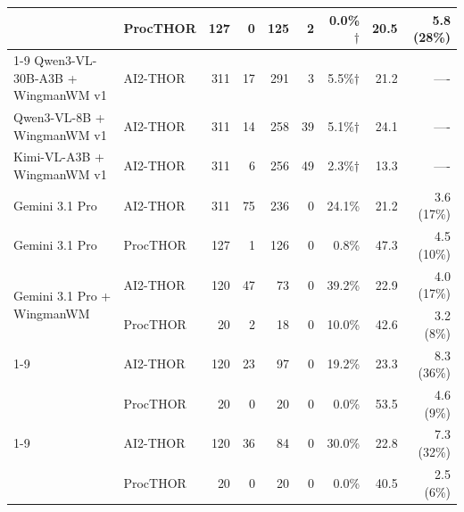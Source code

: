 \documentclass[10pt]{article}
\begin{document}
\begin{table}[t]
\begin{tabular}{llrrrrrrr}
     & ProcTHOR & 127 & 0 & 125 & 2 & 0.0\%$\dagger$ & 20.5 & 5.8 (28\%) \\
    \cmidrule(l){1-9}
    Qwen3-VL-30B-A3B + WingmanWM v1 & AI2-THOR & 311 & 17 & 291 & 3 & 5.5\%$\dagger$ & 21.2 & ---- \\
    Qwen3-VL-8B + WingmanWM v1 & AI2-THOR & 311 & 14 & 258 & 39 & 5.1\%$\dagger$ & 24.1 & ---- \\
    Kimi-VL-A3B + WingmanWM v1 & AI2-THOR & 311 & 6 & 256 & 49 & 2.3\%$\dagger$ & 13.3 & ---- \\
    Gemini 3.1 Pro & AI2-THOR & 311 & 75 & 236 & 0 & 24.1\% & 21.2 & 3.6 (17\%) \\
    Gemini 3.1 Pro & ProcTHOR & 127 & 1 & 126 & 0 & 0.8\% & 47.3 & 4.5 (10\%) \\
    \multirow{2}{*}{Gemini 3.1 Pro + WingmanWM} & AI2-THOR & 120 & 47 & 73 & 0 & 39.2\% & 22.9 & 4.0 (17\%) \\
     & ProcTHOR & 20 & 2 & 18 & 0 & 10.0\% & 42.6 & 3.2 (8\%) \\
    \cmidrule(l){1-9}
    \multirow{2}{*}{GPT-5} & AI2-THOR & 120 & 23 & 97 & 0 & 19.2\% & 23.3 & 8.3 (36\%) \\
     & ProcTHOR & 20 & 0 & 20 & 0 & 0.0\% & 53.5 & 4.6 (9\%) \\
    \cmidrule(l){1-9}
    \multirow{2}{*}{GPT-5 + WingmanWM} & AI2-THOR & 120 & 36 & 84 & 0 & 30.0\% & 22.8 & 7.3 (32\%) \\
     & ProcTHOR & 20 & 0 & 20 & 0 & 0.0\% & 40.5 & 2.5 (6\%) \\
    \bottomrule
  \end{tabular}
\end{table}
\end{document}
